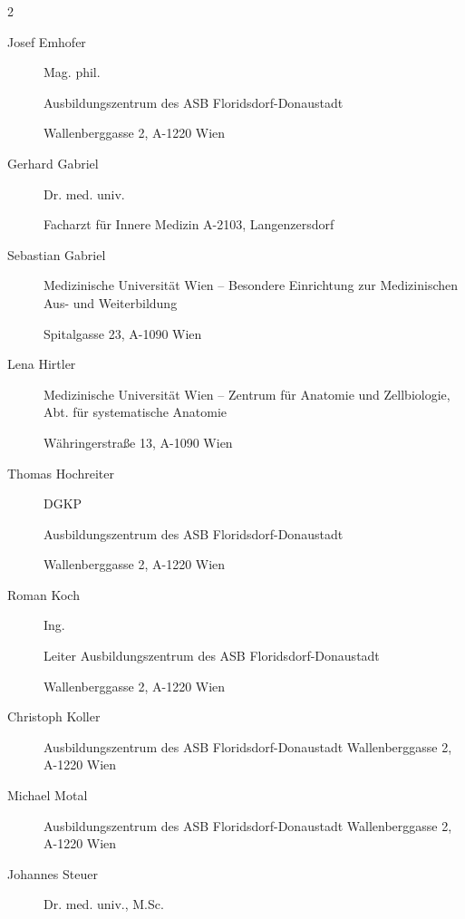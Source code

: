 \documentclass[ngerman,a4paper,fontsize=9pt,BCOR=1.5cm,headings=big,draft=no]{scrbook}
\begin{document}
\begin{multicols}{2}
\begin{description}
    
    \item[Josef Emhofer]
    Mag. phil.
    
    Ausbildungszentrum des ASB Floridsdorf-Donaustadt
    
    Wallenberggasse 2, A-1220 Wien\\
    \item[Gerhard Gabriel]
    Dr. med. univ.
    
    Facharzt f\"ur Innere Medizin
    A-2103, Langenzersdorf
    
    \item[Sebastian Gabriel]
    
    Medizinische Universität Wien -- Besondere Einrichtung zur
    Medizinischen Aus- und Weiterbildung
    
    Spitalgasse 23, A-1090 Wien
    
    \item[Lena Hirtler]

    Medizinische Universität Wien -- Zentrum f\"ur Anatomie und
    Zellbiologie, Abt. f\"ur systematische Anatomie
    
    Währingerstra{\ss}e 13, A-1090 Wien
    
    \item[Thomas Hochreiter]
    DGKP
    
    Ausbildungszentrum des ASB Floridsdorf-Donaustadt
    
    Wallenberggasse 2, A-1220 Wien
    
    \item[Roman Koch] 
    Ing.
    
    Leiter Ausbildungszentrum des ASB Floridsdorf-Donaustadt
    
    Wallenberggasse 2, A-1220 Wien
    
    \item[Christoph Koller]
    Ausbildungszentrum des ASB Floridsdorf-Donaustadt
    Wallenberggasse 2, A-1220 Wien\\
    
    \item[Michael Motal]
    Ausbildungszentrum des ASB Floridsdorf-Donaustadt
    Wallenberggasse 2, A-1220 Wien\\
    
    \item[Johannes Steuer]
    Dr. med. univ., M.Sc.
    

\end{description}
\end{multicols}
\end{document}
